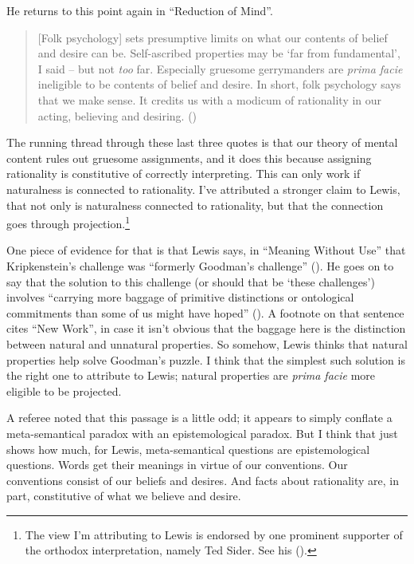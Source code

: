 \documentclass[
  11pt,
  letterpaper,
  DIV=11,
  numbers=noendperiod,
  twoside]{scrartcl}
\begin{document}
He returns to this point again in ``Reduction of Mind''.

\begin{quote}
{[}Folk psychology{]} sets presumptive limits on what our contents of
belief and desire can be. Self-ascribed properties may be `far from
fundamental', I said -- but not \emph{too} far. Especially gruesome
gerrymanders are \emph{prima facie} ineligible to be contents of belief
and desire. In short, folk psychology says that we make sense. It
credits us with a modicum of rationality in our acting, believing and
desiring. ()
\end{quote}

The running thread through these last three quotes is that our theory of
mental content rules out gruesome assignments, and it does this because
assigning rationality is constitutive of correctly interpreting. This
can only work if naturalness is connected to rationality. I've
attributed a stronger claim to Lewis, that not only is naturalness
connected to rationality, but that the connection goes through
projection.\footnote{The view I'm attributing to Lewis is endorsed by
  one prominent supporter of the orthodox interpretation, namely Ted
  Sider. See his ().}

One piece of evidence for that is that Lewis says, in ``Meaning Without
Use'' that Kripkenstein's challenge was ``formerly Goodman's challenge''
(). He goes on to say that the
solution to this challenge (or should that be `these challenges')
involves ``carrying more baggage of primitive distinctions or
ontological commitments than some of us might have hoped''
(). A footnote on that
sentence cites ``New Work'', in case it isn't obvious that the baggage
here is the distinction between natural and unnatural properties. So
somehow, Lewis thinks that natural properties help solve Goodman's
puzzle. I think that the simplest such solution is the right one to
attribute to Lewis; natural properties are \emph{prima facie} more
eligible to be projected.

A referee noted that this passage is a little odd; it appears to simply
conflate a meta-semantical paradox with an epistemological paradox. But
I think that just shows how much, for Lewis, meta-semantical questions
are epistemological questions. Words get their meanings in virtue of our
conventions. Our conventions consist of our beliefs and desires. And
facts about rationality are, in part, constitutive of what we believe
and desire.
\end{document}
